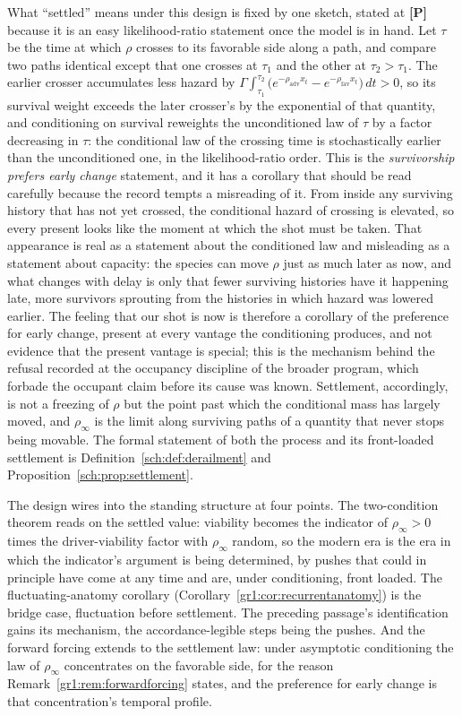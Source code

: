 What ``settled'' means under this design is fixed by one sketch,
stated at \textbf{[P]} because it is an easy likelihood-ratio
statement once the model is in hand. Let $\tau$ be the time at which
$\rho$ crosses to its favorable side along a path, and compare two
paths identical except that one crosses at $\tau_1$ and the other at
$\tau_2>\tau_1$. The earlier crosser accumulates less hazard by
$\Gamma\!\int_{\tau_1}^{\tau_2}\bigl(e^{-\rho_{\mathrm{adv}}x_t}
-e^{-\rho_{\mathrm{fav}}x_t}\bigr)\,dt>0$, so its survival weight
exceeds the later crosser's by the exponential of that quantity, and
conditioning on survival reweights the unconditioned law of $\tau$
by a factor decreasing in $\tau$: the conditional law of the
crossing time is stochastically earlier than the unconditioned one,
in the likelihood-ratio order. This is the \emph{survivorship prefers
early change} statement, and it has a corollary that should be read
carefully because the record tempts a misreading of it. From inside
any surviving history that has not yet crossed, the conditional
hazard of crossing is elevated, so every present looks like the
moment at which the shot must be taken. That appearance is real as a
statement about the conditioned law and misleading as a statement
about capacity: the species can move $\rho$ just as much later as
now, and what changes with delay is only that fewer surviving
histories have it happening late, more survivors sprouting from the
histories in which hazard was lowered earlier. The feeling that our
shot is now is therefore a corollary of the preference for early
change, present at every vantage the conditioning produces, and not
evidence that the present vantage is special; this is the mechanism
behind the refusal recorded at the occupancy discipline of the broader program,
which forbade the occupant claim before its cause was known.
Settlement, accordingly, is not a freezing of $\rho$ but the point
past which the conditional mass has largely moved, and $\rho_\infty$
is the limit along surviving paths of a quantity that never stops
being movable. The formal statement of both the process and its
front-loaded settlement is Definition~\ref{sch:def:derailment} and
Proposition~\ref{sch:prop:settlement}.

The design wires into the standing structure at four points. The
two-condition theorem reads on the settled value: viability becomes
the indicator of $\rho_\infty>0$ times the driver-viability factor with
$\rho_\infty$ random, so the modern era is the era in which the
indicator's argument is being determined, by pushes that could in
principle have come at any time and are, under conditioning, front
loaded. The fluctuating-anatomy corollary
(Corollary~\ref{gr1:cor:recurrentanatomy}) is the bridge case,
fluctuation before settlement. The preceding passage's
identification gains its mechanism, the accordance-legible steps
being the pushes. And the forward forcing extends to the settlement
law: under asymptotic conditioning the law of $\rho_\infty$
concentrates on the favorable side, for the reason
Remark~\ref{gr1:rem:forwardforcing} states, and the preference for
early change is that concentration's temporal profile.

